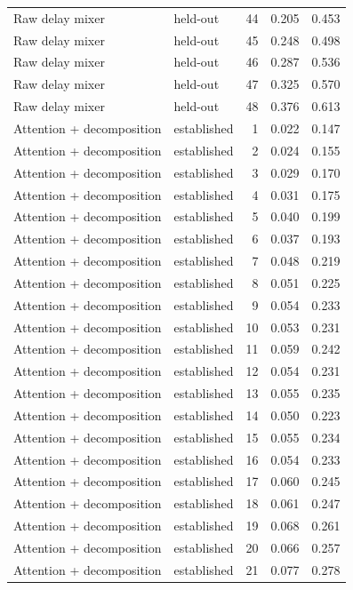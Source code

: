 \begin{tabular}{llrrr}
Raw delay mixer & held-out & 44 & 0.205 & 0.453 \\
Raw delay mixer & held-out & 45 & 0.248 & 0.498 \\
Raw delay mixer & held-out & 46 & 0.287 & 0.536 \\
Raw delay mixer & held-out & 47 & 0.325 & 0.570 \\
Raw delay mixer & held-out & 48 & 0.376 & 0.613 \\
Attention + decomposition & established & 1 & 0.022 & 0.147 \\
Attention + decomposition & established & 2 & 0.024 & 0.155 \\
Attention + decomposition & established & 3 & 0.029 & 0.170 \\
Attention + decomposition & established & 4 & 0.031 & 0.175 \\
Attention + decomposition & established & 5 & 0.040 & 0.199 \\
Attention + decomposition & established & 6 & 0.037 & 0.193 \\
Attention + decomposition & established & 7 & 0.048 & 0.219 \\
Attention + decomposition & established & 8 & 0.051 & 0.225 \\
Attention + decomposition & established & 9 & 0.054 & 0.233 \\
Attention + decomposition & established & 10 & 0.053 & 0.231 \\
Attention + decomposition & established & 11 & 0.059 & 0.242 \\
Attention + decomposition & established & 12 & 0.054 & 0.231 \\
Attention + decomposition & established & 13 & 0.055 & 0.235 \\
Attention + decomposition & established & 14 & 0.050 & 0.223 \\
Attention + decomposition & established & 15 & 0.055 & 0.234 \\
Attention + decomposition & established & 16 & 0.054 & 0.233 \\
Attention + decomposition & established & 17 & 0.060 & 0.245 \\
Attention + decomposition & established & 18 & 0.061 & 0.247 \\
Attention + decomposition & established & 19 & 0.068 & 0.261 \\
Attention + decomposition & established & 20 & 0.066 & 0.257 \\
Attention + decomposition & established & 21 & 0.077 & 0.278 \\

\end{tabular}
